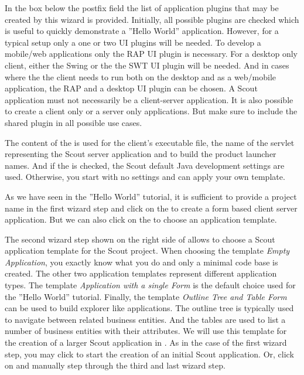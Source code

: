 \documentclass[a4paper,10pt,twoside]{book}
\begin{document}
In the box below the postfix field the list of application plugins that may be created by this wizard is provided. 
Initially, all possible plugins are checked which is useful to quickly demonstrate a ''Hello World'' application.
However, for a typical setup only a one or two UI plugins will be needed. 
To develop a mobile/web applications only the RAP UI plugin is necessary. 
For a desktop only client, either the Swing or the the SWT UI plugin will be needed.
And in cases where the the client needs to run both on the desktop and as a web/mobile application, the RAP and a desktop UI plugin can be chosen. 
A Scout application must not necessarily be a client-server application. 
It is also possible to create a client only or a server only applications. 
But make sure to include the shared plugin in all possible use cases. 

The content of the  is used for the client's executable file, the name of the servlet representing the Scout server application and to build the product launcher names. 
And if the  is checked, the Scout default Java development settings are used. 
Otherwise, you start with no settings and can apply your own template. 

As we have seen in the ''Hello World'' tutorial, it is sufficient to provide a project name in the first wizard step and click on the  to create a form based client server application. 
But we can also click on the  to choose an application template.

The second wizard step shown on the right side of  allows to choose a Scout application template for the Scout project. 
When choosing the template \textit{Empty Application}, you exactly know what you do and only a minimal code base is created. 
The other two application templates represent different application types. 
The template \textit{Application with a single Form} is the default choice used for the ''Hello World'' tutorial.
Finally, the template \textit{Outline Tree and Table Form} can be used to build explorer like applications. 
The outline tree is typically used to navigate between related business entities. 
And the tables are used to list a number of business entities with their attributes. 
We will use this template for the creation of a larger Scout application in . 
As in the case of the first wizard step, you may click  to start the creation of an initial Scout application. 
Or, click on  and manually step through the third and last wizard step. 
\end{document}

